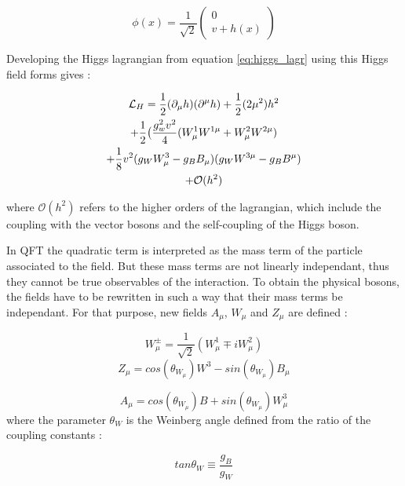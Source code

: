 \begin{equation}
    \phi(x) = \frac{1}{\sqrt{2}} \begin{pmatrix} 0 \\ v + h(x) \end{pmatrix}
    \label{eq:simphiggsfield}
\end{equation}

Developing the Higgs lagrangian from equation \ref{eq:higgs_lagr} using this Higgs field forms gives :

\begin{multline}
    \mathcal{L}_H = \frac{1}{2}(\partial_{\mu}h)(\partial^{\mu}h) + \frac{1}{2}(2\mu^2 )h^2 \\ + \frac{1}{2} \big( \frac{g^{2}_w v^2}{4} (W_{\mu}^1 W^{1\mu} + W_{\mu}^2 W^{2\mu}) \\ + \frac{1}{8} v^2 (g_W W_{\mu}^3 - g_B B_{\mu})(g_W W^{3\mu} - g_B B^{\mu}) \\ + \mathcal{O}(h^2)
    \label{eq:hlagr}
\end{multline}

where $\mathcal{O}(h^2)$ refers to the higher orders of the lagrangian, which include the coupling with the vector bosons and the self-coupling of the Higgs boson.

In QFT the quadratic term is interpreted as the mass term of the particle associated to the field. But these mass terms are not linearly independant, thus they cannot be true observables of the interaction. To obtain the physical bosons, the fields have to be rewritten in such a way that their mass terms be independant. For that purpose, new fields $A_{\mu}$, $W_{\mu}$ and $Z_{\mu}$ are defined :

\begin{equation}
    W^{\pm}_\mu = \frac{1}{\sqrt{2}}(W_{\mu}^1 \mp iW_{\mu}^2)
\end{equation}
\begin{equation}
    Z_{\mu} = cos(\theta_{W_{\mu}})W^3 - sin(\theta_{W_{\mu}})B_{\mu}
\end{equation}

\begin{equation}
    A_{\mu} = cos(\theta_{W_{\mu}})B + sin(\theta_{W_{\mu}})W_{\mu}^3
\end{equation}
where the parameter $\theta_W$ is the Weinberg angle \cite{GLASHOW1961579} defined from the ratio of the coupling constants :

\begin{equation}
    tan \theta_W \equiv \frac{g_B}{g_W}
\end{equation}


